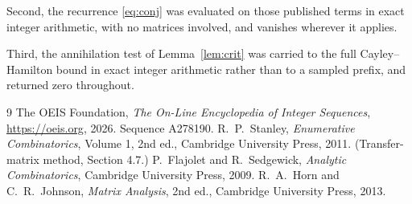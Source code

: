 \documentclass[11pt,a4paper]{article}
\theoremstyle{plain}
\theoremstyle{definition}
\begin{document}
Second, the recurrence \eqref{eq:conj} was evaluated on those published terms in exact
integer arithmetic, with no matrices involved, and vanishes wherever it applies.

Third, the annihilation test of Lemma~\ref{lem:crit} was carried to the full
Cayley--Hamilton bound in exact integer arithmetic rather than to a sampled prefix, and
returned zero throughout.

\begin{thebibliography}{9}
 The OEIS Foundation, \emph{The On-Line Encyclopedia of Integer
Sequences}, \url{https://oeis.org}, 2026. Sequence A278190.
 R.~P.~Stanley, \emph{Enumerative Combinatorics}, Volume 1, 2nd ed.,
Cambridge University Press, 2011. (Transfer-matrix method, Section 4.7.)
 P.~Flajolet and R.~Sedgewick, \emph{Analytic Combinatorics}, Cambridge
University Press, 2009.
 R.~A.~Horn and C.~R.~Johnson, \emph{Matrix Analysis}, 2nd ed., Cambridge
University Press, 2013.
\end{thebibliography}
\end{document}
